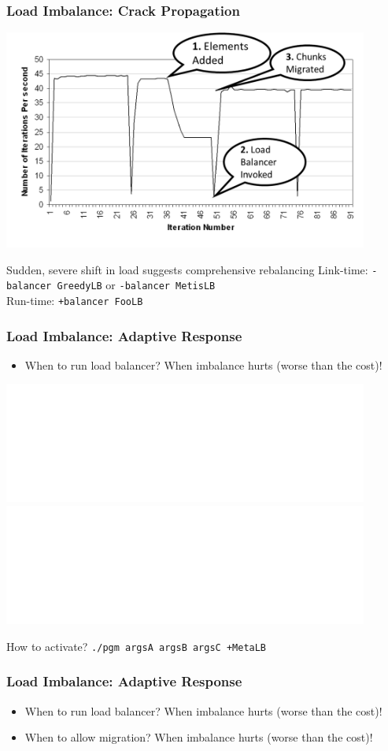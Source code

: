 \begin{frame}[fragile]
\frametitle{Load Imbalance: Crack Propagation}
\begin{centering}
\includegraphics[width=0.9\textwidth]{../figures/LButilizationCrackPropWithAnnotation}
\end{centering}
\pause
\begin{block}{Sudden, severe shift in load suggests comprehensive rebalancing}
Link-time: \texttt{-balancer GreedyLB} or \texttt{-balancer MetisLB} \\
Run-time: \texttt{+balancer FooLB}
\end{block}
\end{frame}


\begin{frame}[t]
\frametitle{Load Imbalance: Adaptive Response}
\begin{itemize}
\item When to run load balancer? \pause When imbalance hurts (worse than the cost)!
\end{itemize}
\includegraphics<2>[width=0.9\textwidth]{../figures/figs_frac_titan_lb300_vp4k_64_proj.pdf}
\includegraphics<3>[width=0.9\textwidth]{../figures/figs_frac_titan_meta_vp4k_64_proj.pdf}
\begin{block}{How to activate?}
\texttt{./pgm argsA argsB argsC +MetaLB}
\end{block}
\end{frame}

\begin{frame}
\frametitle{Load Imbalance: Adaptive Response}
\begin{itemize}
\item When to run load balancer? When imbalance hurts (worse than the cost)!
\item When to allow migration? \pause When imbalance hurts (worse than the cost)!
\end{itemize}
\end{frame}
